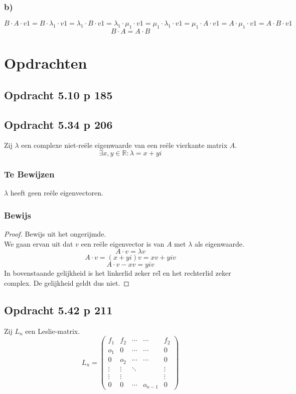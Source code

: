 \documentclass[lineaire_algebra_oplossingen.tex]{subfiles}
\begin{document}
\subsubsection*{b)}
\[
B\cdot A\cdot v1
= B\cdot \lambda_1\cdot v1
= \lambda_1\cdot B\cdot v1
= \lambda_1\cdot \mu_1\cdot v1
= \mu_1\cdot \lambda_1\cdot v1
= \mu_1\cdot A\cdot v1
= A\cdot \mu_1\cdot v1
= A\cdot B\cdot v1
\]
\[
B\cdot A = A\cdot B
\]


\section{Opdrachten}
\subsection{Opdracht 5.10 p 185}

\subsection{Opdracht 5.34 p 206}
Zij $\lambda$ een complexe niet-re\"ele eigenwaarde van een re\"ele vierkante matrix $A$.
\[
\exists x,y \in \mathbb{R}: \lambda = x +yi
\]

\subsubsection*{Te Bewijzen}
$\lambda$ heeft geen re\"ele eigenvectoren.

\subsubsection*{Bewijs}
\begin{proof}
Bewijs uit het ongerijmde.\\
We gaan ervan uit dat $v$ een re\"ele eigenvector is van $A$ met $\lambda$ als eigenwaarde.
\[
A\cdot v = \lambda v
\]
\[
A\cdot v = (x+yi) v= xv + yiv
\]
\[
A\cdot v - xv = yiv
\]
In bovenstaande gelijkheid is het linkerlid zeker re\"l en het rechterlid zeker complex.
De gelijkheid geldt dus niet. 
\end{proof}


\subsection{Opdracht 5.42 p 211}
Zij $L_n$ een Leslie-matrix.
\[
L_n =
\begin{pmatrix}
f_1 & f_2 & \cdots & \cdots & f_2\\
o_1 & 0 & \cdots & \cdots & 0\\
0 & o_2 & \cdots & \cdots & 0\\
\vdots & \vdots & \ddots & & \vdots\\
\vdots & \vdots & & & \vdots\\
0 & 0 & \cdots & o_{n-1} & 0
\end{pmatrix}
\]
\end{document}
